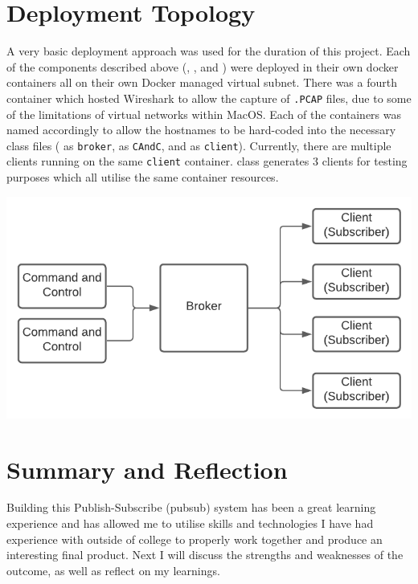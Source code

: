 \documentclass{article}
\newcommand{\code}[1]{\colorbox{light-gray}{\texttt{#1}}}
\begin{document}
    \section{Deployment Topology}
    \label{sec:Topology}
    A very basic deployment approach was used for the duration of this project. Each of the components described above (, , and ) were deployed in their own docker containers all on their own Docker managed virtual subnet. There was a fourth container which hosted Wireshark to allow the capture of \code{.PCAP} files, due to some of the limitations of virtual networks within MacOS. Each of the containers was named accordingly to allow the hostnames to be hard-coded into the necessary class files ( as \code{broker},  as \code{CAndC}, and  as \code{client}). Currently, there are multiple clients running on the same \code{client} container.  class generates 3 clients for testing purposes which all utilise the same container resources.
    
    \begin{center}
        \includegraphics[width=0.7\linewidth]{topography.png}
    \end{center}
    
    \newpage
    \section{Summary and Reflection}
    \label{sec:summary}
    Building this Publish-Subscribe (pubsub) system has been a great learning experience and has allowed me to utilise skills and technologies I have had experience with outside of college to properly work together and produce an interesting final product. Next I will discuss the strengths and weaknesses of the outcome, as well as reflect on my learnings.
\end{document}
